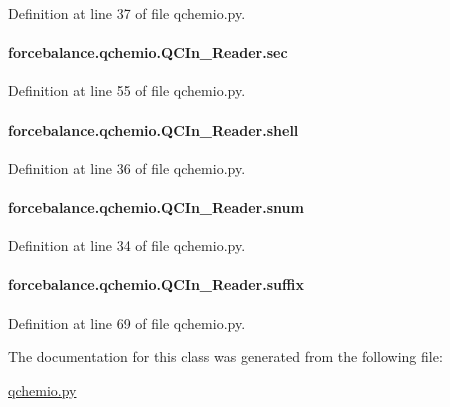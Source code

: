 Definition at line 37 of file qchemio.\-py.

\hypertarget{classforcebalance_1_1qchemio_1_1QCIn__Reader_adec1bddb76f9cb96812814181986b95c}{
\paragraph[{sec}]{\setlength{\rightskip}{0pt plus 5cm}forcebalance.\-qchemio.\-Q\-C\-In\-\_\-\-Reader.\-sec}}\label{classforcebalance_1_1qchemio_1_1QCIn__Reader_adec1bddb76f9cb96812814181986b95c}


Definition at line 55 of file qchemio.\-py.

\hypertarget{classforcebalance_1_1qchemio_1_1QCIn__Reader_a7cc88079e27ea6aa7550e28d57ec6afb}{
\paragraph[{shell}]{\setlength{\rightskip}{0pt plus 5cm}forcebalance.\-qchemio.\-Q\-C\-In\-\_\-\-Reader.\-shell}}\label{classforcebalance_1_1qchemio_1_1QCIn__Reader_a7cc88079e27ea6aa7550e28d57ec6afb}


Definition at line 36 of file qchemio.\-py.

\hypertarget{classforcebalance_1_1qchemio_1_1QCIn__Reader_ad3615ef269aab5468394d3d49d49b754}{
\paragraph[{snum}]{\setlength{\rightskip}{0pt plus 5cm}forcebalance.\-qchemio.\-Q\-C\-In\-\_\-\-Reader.\-snum}}\label{classforcebalance_1_1qchemio_1_1QCIn__Reader_ad3615ef269aab5468394d3d49d49b754}


Definition at line 34 of file qchemio.\-py.

\hypertarget{classforcebalance_1_1qchemio_1_1QCIn__Reader_ae20caa518b899a0f26916966625ca40c}{
\paragraph[{suffix}]{\setlength{\rightskip}{0pt plus 5cm}forcebalance.\-qchemio.\-Q\-C\-In\-\_\-\-Reader.\-suffix}}\label{classforcebalance_1_1qchemio_1_1QCIn__Reader_ae20caa518b899a0f26916966625ca40c}


Definition at line 69 of file qchemio.\-py.



The documentation for this class was generated from the following file\-:\begin{DoxyCompactItemize}
\item 
\hyperlink{qchemio_8py}{qchemio.\-py}\end{DoxyCompactItemize}

